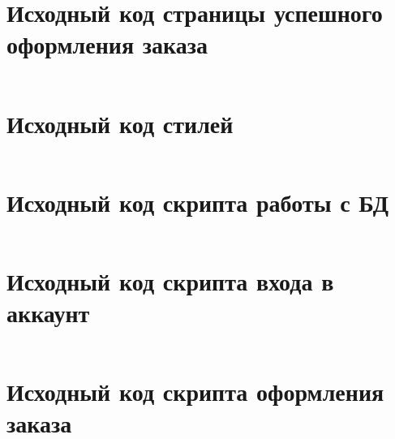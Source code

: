 \documentclass[a4paper, 14pt]{extarticle}
\newenvironment{code}{\captionsetup{type=listing}}{}
\begin{document}
\begin{code}
  \inputminted{html}{../code/order.html}
\end{code}

\newpage

\section{Исходный код страницы успешного оформления заказа}
\label{app:order-success.html}

\begin{code}
  \inputminted{html}{../code/order-success.html}
\end{code}

\newpage

\section{Исходный код стилей}
\label{app:style.css}

\begin{code}
  \inputminted{css}{../code/css/style.css}
\end{code}

\newpage

\section{Исходный код скрипта работы с БД}
\label{app:database.php}

\begin{code}
  \inputminted{php}{../code/database.php}
\end{code}

\newpage

\section{Исходный код скрипта входа в аккаунт}
\label{app:login.php}

\begin{code}
  \inputminted{php}{../code/login.php}
\end{code}

\newpage

\section{Исходный код скрипта оформления заказа}
\label{app:order.php}

\begin{code}
  \inputminted{php}{../code/order.php}
\end{code}
\end{document}
